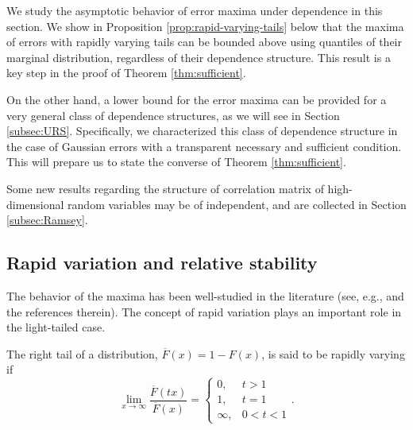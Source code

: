 
We study the asymptotic behavior of error maxima under dependence in this section.
We show in Proposition \ref{prop:rapid-varying-tails} below that the maxima of errors with rapidly varying tails can be bounded above using quantiles of their marginal distribution, regardless of their dependence structure. 
This result is a key step in the proof of Theorem \ref{thm:sufficient}.

On the other hand, a lower bound for the error maxima can be provided for a very general class of dependence structures, as we will see in Section \ref{subsec:URS}. 
Specifically, we characterized this class of dependence structure in the case of Gaussian errors with a transparent necessary and sufficient condition.
This will prepare us to state the converse of Theorem \ref{thm:sufficient}.

Some new results regarding the structure of correlation matrix of high-dimensional random variables may be of independent, and are collected in Section \ref{subsec:Ramsey}.

\subsection{Rapid variation and relative stability}
\label{subsec:RS}

The behavior of the maxima has been well-studied in the literature (see, e.g., \cite{leadbetter2012extremes,resnick2013extreme,embrechts2013modelling,de2007extreme} 
and the references therein). The concept of rapid variation plays an important role in the light-tailed case.

\begin{definition} \label{def:rapid-variation}
The right tail of a distribution, $\overline{F}(x) = 1 - F(x)$, is said to be rapidly varying if
\begin{equation}\label{e:def:rapid-variation}
\lim_{x\to\infty} \frac{\overline{F}(tx)}{\overline{F}(x)} 
    = \begin{cases}
    0, & t > 1\\
    1, & t = 1\\
    \infty, & 0 < t < 1
\end{cases}.
\end{equation}
\end{definition}

